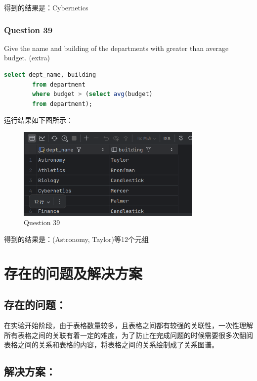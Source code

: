 \documentclass{article}
\begin{document}
    得到的结果是：Cybernetics
    
    \subsubsection{Question 39}
    
    Give the name and building of the departments with greater than average budget.  (extra)
    
    \begin{lstlisting}[language=sql, title=Question 39, tabsize=4]
    	select dept_name, building
    	from department
    	where budget > (select avg(budget)
    	from department);
    \end{lstlisting}
    
    运行结果如下图所示：
    
    \begin{figure}[H]
    	\centering
    	\includegraphics[width=9cm]{./images/44.Question39.png}
    	\caption{Question 39}
    \end{figure}
    
    得到的结果是：(Astronomy, Taylor)等12个元组
    
    
    \section{存在的问题及解决方案}
    
    \subsection{存在的问题：}
    
    在实验开始阶段，由于表格数量较多，且表格之间都有较强的关联性，一次性理解所有表格之间的关联有着一定的难度，为了防止在完成问题的时候需要很多次翻阅表格之间的关系和表格的内容，将表格之间的关系绘制成了关系图谱。
    
    \subsection{解决方案：}
    
\end{document}
